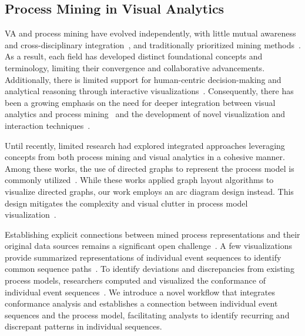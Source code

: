 \documentclass[preprint,journal]{vgtc}            %
\begin{document}
\subsection{Process Mining in Visual Analytics}

VA and process mining have evolved independently, with little mutual awareness and cross-disciplinary integration~\cite{Miksch24Visual, Gschwandtner17Visual}, and traditionally prioritized mining methods~\cite{Rinderle23Process, Daniel12Business}.
As a result, each field has developed distinct foundational concepts and terminology, limiting their convergence and collaborative advancements.
Additionally, there is limited support for human-centric decision-making and analytical reasoning through interactive visualizations~\cite{Di24Human, Keim08Visual}.
Consequently, there has been a growing emphasis on the need for deeper integration between visual analytics and process mining~\cite{Kriglstein16Visual, Gschwandtner17Visual, Miksch24Visual} and the development of novel visualization and interaction techniques~\cite{Klinkmuller19Mining, García18Complete, Jana22Process}.

Until recently, limited research had explored integrated approaches leveraging concepts from both process mining and visual analytics in a cohesive manner.
Among these works, the use of directed graphs to represent the process model is commonly utilized~\cite{Maguire13Visual, Hipp12Navigating, Christian07Fuzzy}.
While these works applied graph layout algorithms to visualize directed graphs, our work employs an arc diagram design instead. 
This design mitigates the complexity and visual clutter in process model visualization~\cite{Miksch24Visual}.

Establishing explicit connections between mined process representations and their original data sources remains a significant open challenge~\cite{Zerbato23Supporting}.
A few visualizations provide summarized representations of individual event sequences to identify common sequence paths~\cite{Bodesinsky15Exploration, Song07Supporting}.
To identify deviations and discrepancies from existing process models, researchers computed and visualized the conformance of individual event sequences~\cite{Adriansyah11Conformance, Bodesinsky13Visual}.
We introduce a novel workflow that integrates conformance analysis and establishes a connection between individual event sequences and the process model, facilitating analysts to identify recurring and discrepant patterns in individual sequences. 
\end{document}
